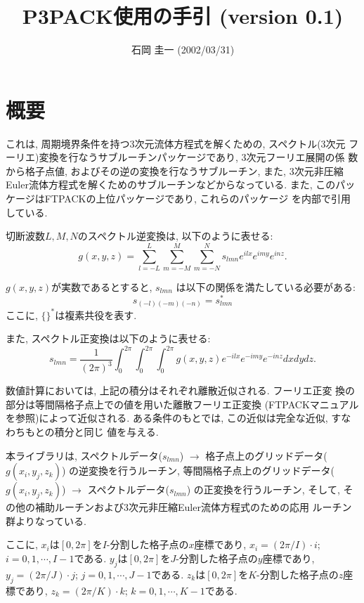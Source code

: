 \documentclass[a4j,fleqn]{jarticle}
\title{P3PACK使用の手引 (version 0.1)}
\author{石岡 圭一  (2002/03/31)}
\date{}
\begin{document}
\maketitle

\section{概要}

これは, 周期境界条件を持つ3次元流体方程式を解くための, スペクトル(3次元
フーリエ)変換を行なうサブルーチンパッケージであり, 3次元フーリエ展開の係
数から格子点値, およびその逆の変換を行なうサブルーチン, また, 
3次元非圧縮Euler流体方程式を解くためのサブルーチンなどからなっている. 
また, このパッケージはFTPACKの上位パッケージであり, これらのパッケージ
を内部で引用している.

切断波数$L,M,N$のスペクトル逆変換は, 以下のように表せる:
\begin{equation}
g(x,y,z)=\sum^L_{l=-L}\sum^M_{m=-M}\sum^N_{m=-N}
s_{lmn}e^{ilx}e^{imy}e^{inz}.
\end{equation}

$g(x,y,z)$が実数であるとすると, $s_{lmn}$
は以下の関係を満たしている必要がある:
\begin{equation}
s_{(-l)(-m)(-n)}=s_{lmn}^{*}
\end{equation}
ここに, $\{ \}^{*}$は複素共役を表す.

また, スペクトル正変換は以下のように表せる:
\begin{equation}
s_{lmn}=\frac1{(2\pi)^3}\int^{2\pi}_0\int^{2\pi}_0\int^{2\pi}_0
g(x,y,z)e^{-ilx}e^{-imy}e^{-inz}dxdydz.
\end{equation}

数値計算においては, 上記の積分はそれぞれ離散近似される. フーリエ正変
換の部分は等間隔格子点上での値を用いた離散フーリエ正変換
(FTPACKマニュアルを参照)によって近似される.
ある条件のもとでは, この近似は完全な近似, すなわちもとの積分と同じ
値を与える.

本ライブラリは, 
スペクトルデータ($s_{lmn}$)
$\to$ 格子点上のグリッドデータ($g(x_i,y_j,z_k)$) 
の逆変換を行うルーチン,
等間隔格子点上のグリッドデータ($g(x_i,y_j,z_k)$)
$\to$ スペクトルデータ($s_{lmn}$) 
の正変換を行うルーチン, 
そして, その他の補助ルーチンおよび3次元非圧縮Euler流体方程式のための応用
ルーチン群よりなっている.

ここに, $x_i$は$[0,2\pi]$を$I$-分割した格子点の$x$座標であり,
$x_i=(2\pi/I)\cdot i$;  $i=0,1,\cdots,I-1$である.
$y_j$は$[0,2\pi]$を$J$-分割した格子点の$y$座標であり,
$y_j=(2\pi/J)\cdot j$;  $j=0,1,\cdots,J-1$である.
$z_k$は$[0,2\pi]$を$K$-分割した格子点の$z$座標であり,
$z_k=(2\pi/K)\cdot k$;  $k=0,1,\cdots,K-1$である.
\end{document}
